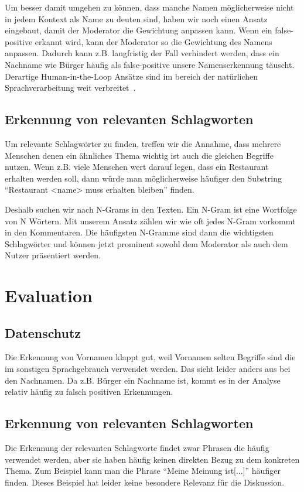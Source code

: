 \documentclass[runningheads]{llncs}
\begin{document}
		Um besser damit umgehen zu können, dass manche Namen möglicherweise nicht in jedem Kontext als Name zu deuten sind, haben wir noch einen Ansatz eingebaut, damit der Moderator die Gewichtung anpassen kann.
		Wenn ein false-positive erkannt wird, kann der Moderator so die Gewichtung des Namens anpassen.
		Dadurch kann z.B. langfristig der Fall verhindert werden, dass ein Nachname wie Bürger häufig als false-positive unsere Namenserkennung täuscht.
		Derartige Human-in-the-Loop Ansätze sind im bereich der natürlichen Sprachverarbeitung weit verbreitet~\cite{bailey2018few}\cite{gronsund2020augmenting}.
	
	\subsection{Erkennung von relevanten Schlagworten}
		Um relevante Schlagwörter zu finden, treffen wir die Annahme, dass mehrere Menschen denen ein ähnliches Thema wichtig ist auch die gleichen Begriffe nutzen.
		Wenn z.B. viele Menschen wert darauf legen, dass ein Restaurant erhalten werden soll, dann würde man möglicherweise häufiger den Substring ``Restaurant <name> muss erhalten bleiben'' finden.
		
		Deshalb suchen wir nach N-Grams in den Texten.
		Ein N-Gram ist eine Wortfolge von N Wörtern.
		Mit unserem Ansatz zählen wir wie oft jedes N-Gram vorkommt in den Kommentaren.
		Die häufigsten N-Gramme sind dann die wichtigsten Schlagwörter und können jetzt prominent sowohl dem Moderator als auch dem Nutzer präsentiert werden.

\section{Evaluation}
	\subsection{Datenschutz}
		Die Erkennung von Vornamen klappt gut, weil Vornamen selten Begriffe sind die im sonstigen Sprachgebrauch verwendet werden.
		Das sieht leider anders aus bei den Nachnamen.
		Da z.B. Bürger ein Nachname ist, kommt es in der Analyse relativ häufig zu falsch positiven Erkennungen.
	\subsection{Erkennung von relevanten Schlagworten}
		Die Erkennung der relevanten Schlagworte findet zwar Phrasen die häufig verwendet werden, aber sie haben häufig keinen direkten Bezug zu dem konkreten Thema.
		Zum Beispiel kann man die Phrase ``Meine Meinung ist[...]'' häufiger finden.
		Dieses Beispiel hat leider keine besondere Relevanz für die Diskussion.
\end{document}
